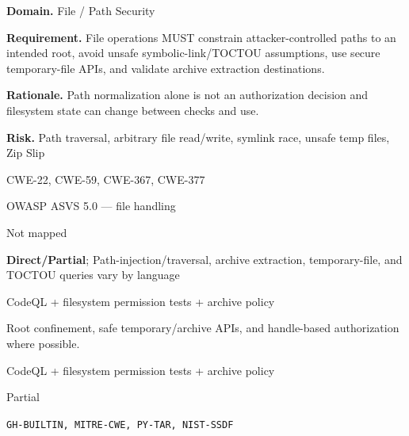 \documentclass[10pt,letterpaper]{article}
\newcommand{\prioritybadge}[2]{\tcbox[on line,boxrule=0pt,arc=1.2mm,boxsep=0.7mm,left=1mm,right=1mm,top=0.4mm,bottom=0.4mm,colback=#2!12,coltext=#2]{\scriptsize\bfseries #1}}
\begin{document}
\begin{rulebox}[title={\texttt{SCS-ALL-FILE-001} \hfill \prioritybadge{High Priority}{High}}]
\textbf{Domain.} File / Path Security

\textbf{Requirement.} File operations MUST constrain attacker-controlled paths to an intended root, avoid unsafe symbolic-link/TOCTOU assumptions, use secure temporary-file APIs, and validate archive extraction destinations.

\textbf{Rationale.} Path normalization alone is not an authorization decision and filesystem state can change between checks and use.

\textbf{Risk.} Path traversal, arbitrary file read/write, symlink race, unsafe temp files, Zip Slip

\begin{description}[leftmargin=2.65cm,labelwidth=2.3cm,style=nextline,itemsep=1pt,topsep=3pt]
  \item[CWE] CWE-22, CWE-59, CWE-367, CWE-377
  \item[OWASP] OWASP ASVS 5.0 --- file handling
  \item[CERT] Not mapped
  \item[CodeQL] \textbf{Direct/Partial}; Path-injection/traversal, archive extraction, temporary-file, and TOCTOU queries vary by language
  \item[Enforcement] CodeQL + filesystem permission tests + archive policy
  \item[Prevention] Root confinement, safe temporary/archive APIs, and handle-based authorization where possible.
  \item[Verification] CodeQL + filesystem permission tests + archive policy
  \item[Automation] Partial
  \item[Sources] \texttt{GH-BUILTIN, MITRE-CWE, PY-TAR, NIST-SSDF}
\end{description}
\end{rulebox}
\end{document}
